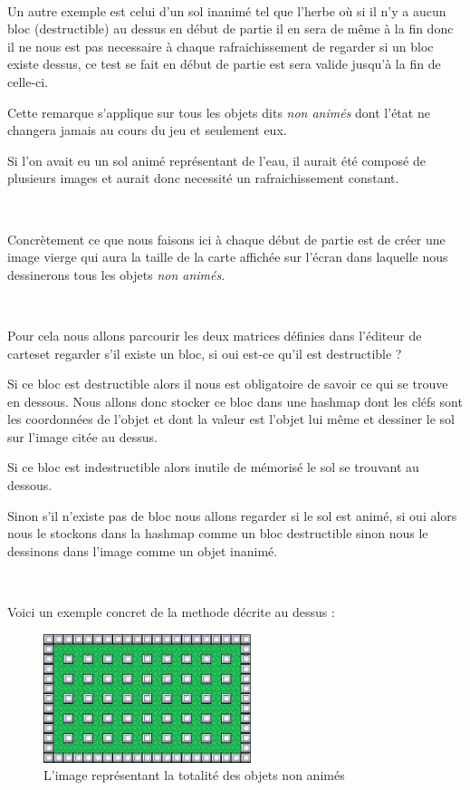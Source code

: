 			$\,$			
			
			Un autre exemple est celui d'un sol inanimé tel que l'herbe où si il n'y a
			aucun bloc (destructible) au dessus en début de partie il en sera de même à
			la fin donc il ne nous est pas necessaire à chaque rafraichissement de
			regarder si un bloc existe dessus, ce test se fait en début de partie est
			sera valide jusqu'à la fin de celle-ci.
			
			
			Cette remarque s'applique sur tous les objets dits \emph{non animés} dont
			l'état ne changera jamais au cours du jeu et seulement eux.
			
			
			Si l'on avait eu un sol animé représentant de l'eau, il aurait été composé de
			plusieurs images et aurait donc necessité un rafraichissement constant.

			$\,$
			
			Concrètement ce que nous faisons ici à chaque début de partie est de créer
			une image vierge qui aura la taille de la carte affichée sur l'écran dans
			laquelle nous dessinerons tous les objets \emph{non animés}.
			
			$\,$
			
			Pour cela nous allons parcourir les deux matrices définies dans l'éditeur de
			cartes\footnotemark[2] et regarder s'il existe un bloc, si oui est-ce
			qu'il est destructible ?
			
			Si ce bloc est destructible alors il nous est obligatoire de savoir ce qui se
			trouve en dessous.
			Nous allons donc stocker ce bloc dans une hashmap dont les cléfs sont les
			coordonnées de l'objet et dont la valeur est l'objet lui même et dessiner le
			sol sur l'image citée au dessus.
			
			Si ce bloc est indestructible alors inutile de mémorisé le sol se trouvant
			au dessous.
			
			Sinon s'il n'existe pas de bloc nous allons regarder si le sol est animé, si
			oui alors nous le stockons dans la hashmap comme un bloc destructible sinon
			nous le dessinons dans l'image comme un objet inanimé.
			
			$\,$
			
			Voici un exemple concret de la methode décrite au dessus :
			

			\begin{figure}[h]			
				\begin{center}			
					\includegraphics[width=229px, height=142px]{Developpement/Img/map.eps}
					\caption{L'image représentant la totalité des objets non animés}
				\end{center}
			\end{figure}

